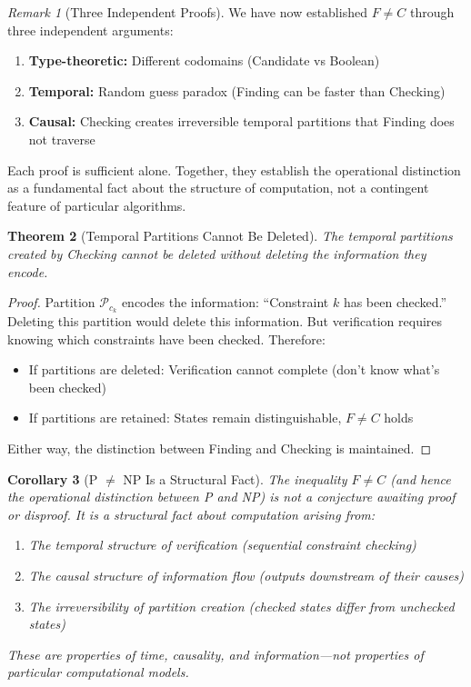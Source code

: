 \documentclass[twocolumn,10pt]{article}
\newtheorem{theorem}{Theorem}[section]
\newtheorem{corollary}[theorem]{Corollary}
\theoremstyle{definition}
\theoremstyle{remark}
\newtheorem{remark}[theorem]{Remark}
\begin{document}
\begin{remark}[Three Independent Proofs]
We have now established $F \neq C$ through three independent arguments:
\begin{enumerate}
\item \textbf{Type-theoretic:} Different codomains (Candidate vs Boolean)
\item \textbf{Temporal:} Random guess paradox (Finding can be faster than Checking)
\item \textbf{Causal:} Checking creates irreversible temporal partitions that Finding does not traverse
\end{enumerate}
Each proof is sufficient alone. Together, they establish the operational distinction as a fundamental fact about the structure of computation, not a contingent feature of particular algorithms.
\end{remark}

\begin{theorem}[Temporal Partitions Cannot Be Deleted]
\label{thm:partitions_irreversible}
The temporal partitions created by Checking cannot be deleted without deleting the information they encode.
\end{theorem}

\begin{proof}
Partition $\mathcal{P}_{c_k}$ encodes the information: ``Constraint $k$ has been checked.'' Deleting this partition would delete this information. But verification requires knowing which constraints have been checked. Therefore:
\begin{itemize}
\item If partitions are deleted: Verification cannot complete (don't know what's been checked)
\item If partitions are retained: States remain distinguishable, $F \neq C$ holds
\end{itemize}
Either way, the distinction between Finding and Checking is maintained.
\end{proof}

\begin{corollary}[P $\neq$ NP Is a Structural Fact]
The inequality $F \neq C$ (and hence the operational distinction between P and NP) is not a conjecture awaiting proof or disproof. It is a structural fact about computation arising from:
\begin{enumerate}
\item The temporal structure of verification (sequential constraint checking)
\item The causal structure of information flow (outputs downstream of their causes)
\item The irreversibility of partition creation (checked states differ from unchecked states)
\end{enumerate}
These are properties of time, causality, and information—not properties of particular computational models.
\end{corollary}
\end{document}
